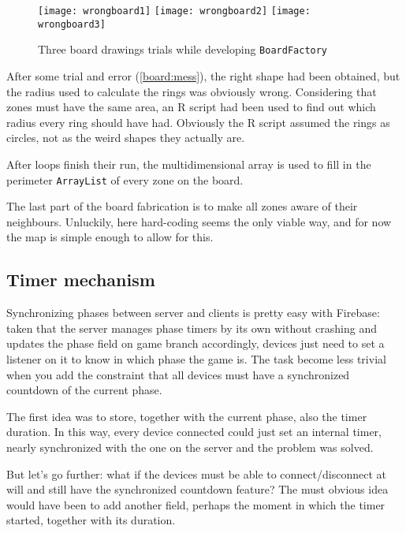 			\begin{figure}[htp]
				\centering
				\texttt{[image: wrongboard1]}
				\hfill %
				\texttt{[image: wrongboard2]}
				\hfill
				\texttt{[image: wrongboard3]}
				
				\caption{Three board drawings trials while developing \lstinline|BoardFactory|}\label{board:mess}
			\end{figure}
			
			After some trial and error (\autoref{board:mess}), the right shape had been obtained, but the radius used to calculate the rings was obviously wrong.
			Considering that zones must have the same area, an R script had been used to find out which radius every ring should have had. Obviously the R script assumed the rings as circles, not as the weird shapes they actually are.
			
			After loops finish their run, the multidimensional array is used to fill in the perimeter \lstinline|ArrayList| of every zone on the board.
			
			The last part of the board fabrication is to make all zones aware of their neighbours. Unluckily, here hard-coding seems the only viable way, and for now the map is simple enough to allow for this.
			
		\subsection{Timer mechanism}\label{focus:timer}
		
			Synchronizing phases between server and clients is pretty easy with Firebase: taken that the server manages phase timers by its own without crashing and updates the phase field on game branch accordingly, devices just need to set a listener on it to know in which phase the game is.
			The task become less trivial when you add the constraint that all devices must have a synchronized countdown of the current phase.
			
			The first idea was to store, together with the current phase, also the timer duration.
			In this way, every device connected could just set an internal timer, nearly synchronized with the one on the server and the problem was solved.
			
			But let's go further: what if the devices must be able to connect/disconnect at will and still have the synchronized countdown feature?
			The must obvious idea would have been to add another field, perhaps the moment in which the timer started, together with its duration.
			
